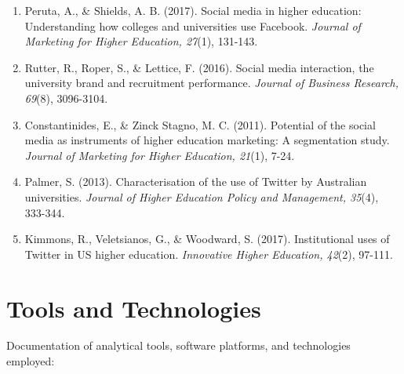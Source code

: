 \documentclass[12pt]{report}
\begin{document}
\begin{enumerate}
\item Peruta, A., \& Shields, A. B. (2017). Social media in higher education: Understanding how colleges and universities use Facebook. \textit{Journal of Marketing for Higher Education, 27}(1), 131-143.

\item Rutter, R., Roper, S., \& Lettice, F. (2016). Social media interaction, the university brand and recruitment performance. \textit{Journal of Business Research, 69}(8), 3096-3104.

\item Constantinides, E., \& Zinck Stagno, M. C. (2011). Potential of the social media as instruments of higher education marketing: A segmentation study. \textit{Journal of Marketing for Higher Education, 21}(1), 7-24.

\item Palmer, S. (2013). Characterisation of the use of Twitter by Australian universities. \textit{Journal of Higher Education Policy and Management, 35}(4), 333-344.

\item Kimmons, R., Veletsianos, G., \& Woodward, S. (2017). Institutional uses of Twitter in US higher education. \textit{Innovative Higher Education, 42}(2), 97-111.
\end{enumerate}

\section{Tools and Technologies}

Documentation of analytical tools, software platforms, and technologies employed:
\end{document}

